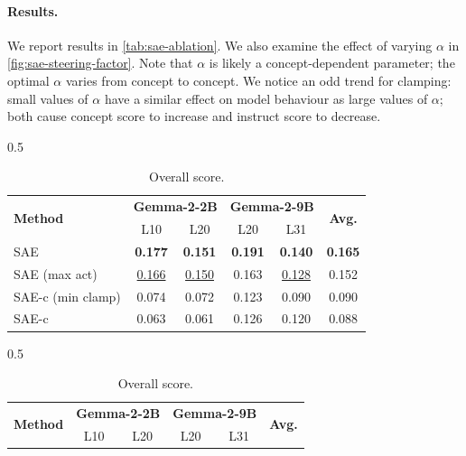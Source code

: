 \documentclass{article}
\theoremstyle{plain}
\theoremstyle{definition}
\theoremstyle{remark}
\begin{document}
\paragraph{Results.} We report results in \cref{tab:sae-ablation}. We also examine the effect of varying $\alpha$ in \cref{fig:sae-steering-factor}. Note that $\alpha$ is likely a concept-dependent parameter; the optimal $\alpha$ varies from concept to concept. We notice an odd trend for clamping: small values of $\alpha$ have a similar effect on model behaviour as large values of $\alpha$; both cause concept score to increase and instruct score to decrease.
\begin{table}[h!]
\begin{subtable}[b]{0.5\textwidth}
    \small
    \centering
\begin{tabular}{lccccc}
\toprule
\multirow[t]{2}{*}{\textbf{Method}} & \multicolumn{2}{c}{\textbf{Gemma-2-2B}}  & \multicolumn{2}{c}{\textbf{Gemma-2-9B}} & \multirow[t]{2}{*}{\textbf{Avg.}} \\
& \multicolumn{1}{c}{L10} & \multicolumn{1}{c}{L20} & \multicolumn{1}{c}{L20} & \multicolumn{1}{c}{L31} \\
\midrule
\rowcolor{blue!20}SAE & \textbf{0.177} & \textbf{0.151} & \textbf{0.191} & \textbf{0.140} & \textbf{0.165} \\
SAE (max act) & \underline{0.166} & \underline{0.150} & 0.163 & \underline{0.128} & 0.152 \\
SAE-c (min clamp) & 0.074 & 0.072 & 0.123 & 0.090 & 0.090 \\
SAE-c & 0.063 & 0.061 & 0.126 & 0.120 & 0.088 \\
\bottomrule
\end{tabular}
\caption{Overall score.}
\end{subtable}
\begin{subtable}[b]{0.5\textwidth}
    \small
    \centering
\begin{tabular}{lccccc}
\toprule
\multirow[t]{2}{*}{\textbf{Method}} & \multicolumn{2}{c}{\textbf{Gemma-2-2B}}  & \multicolumn{2}{c}{\textbf{Gemma-2-9B}} & \multirow[t]{2}{*}{\textbf{Avg.}} \\
& \multicolumn{1}{c}{L10} & \multicolumn{1}{c}{L20} & \multicolumn{1}{c}{L20} & \multicolumn{1}{c}{L31} \\

\end{tabular}
\end{subtable}
\end{table}
\end{document}
